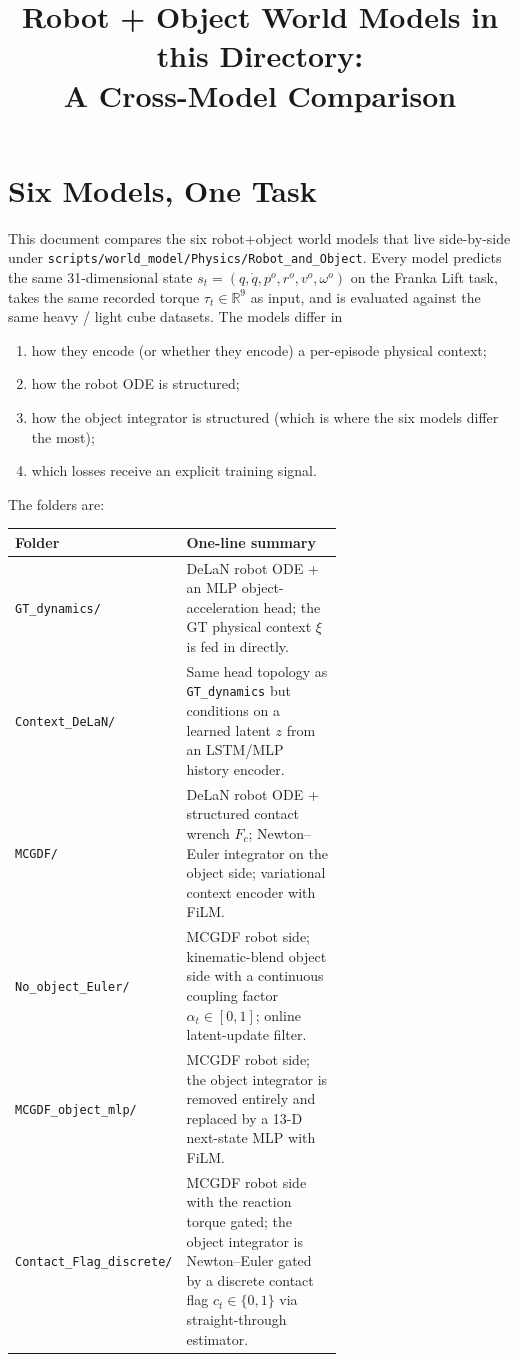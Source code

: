 \documentclass[11pt]{article}
\title{Robot + Object World Models in this Directory:\\A Cross-Model Comparison}
\author{}
\date{}
\begin{document}
\maketitle

\section{Six Models, One Task}

This document compares the six robot+object world models that live
side-by-side under \texttt{scripts/world\_model/Physics/Robot\_and\_Object}.
Every model predicts the same 31-dimensional state $s_t = (q,
\dot q, p^o, r^o, v^o, \omega^o)$ on the Franka Lift task, takes the
same recorded torque $\tau_t \in \mathbb{R}^{9}$ as input, and is
evaluated against the same heavy / light cube datasets.  The models
differ in
\begin{enumerate}
  \item how they encode (or whether they encode) a per-episode
    physical context;
  \item how the robot ODE is structured;
  \item how the object integrator is structured (which is where the
    six models differ the most);
  \item which losses receive an explicit training signal.
\end{enumerate}
The folders are:
\begin{center}
\small
\begin{tabular}{lp{0.65\linewidth}}
\toprule
Folder & One-line summary \\
\midrule
\texttt{GT\_dynamics/}             & DeLaN robot ODE + an MLP object-acceleration head; the GT physical context $\xi$ is fed in directly. \\
\texttt{Context\_DeLaN/}           & Same head topology as \texttt{GT\_dynamics} but conditions on a learned latent $z$ from an LSTM/MLP history encoder. \\
\texttt{MCGDF/}                    & DeLaN robot ODE + structured contact wrench $F_c$; Newton--Euler integrator on the object side; variational context encoder with FiLM. \\
\texttt{No\_object\_Euler/}        & MCGDF robot side; kinematic-blend object side with a continuous coupling factor $\alpha_t \in [0,1]$; online latent-update filter. \\
\texttt{MCGDF\_object\_mlp/}       & MCGDF robot side; the object integrator is removed entirely and replaced by a 13-D next-state MLP with FiLM. \\
\texttt{Contact\_Flag\_discrete/}  & MCGDF robot side with the reaction torque gated; the object integrator is Newton--Euler gated by a discrete contact flag $c_t \in \{0,1\}$ via straight-through estimator. \\
\bottomrule
\end{tabular}
\end{center}
\end{document}
